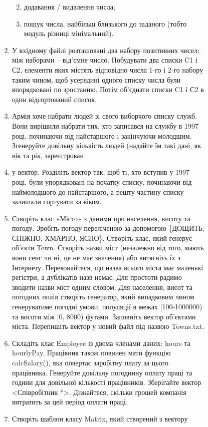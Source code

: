 \documentclass[]{article}
\makeatletter
\newcommand{\xslalph}[1]{\expandafter\@xslalph\csname c@#1\endcsname}
\newcommand{\@xslalph}[1]{%
    \ifcase#1\or а\or б\or в\or г\or д\or e\or є\or ж\or з\or i%
    \or й\or к\or л\or м\or н\or о\or п\or р\or с\or т%
    \or у\or ф\or х\or ц\or ч\or ш\or ю\or я\or аа\or бб\or вв%
    \else\@ctrerr\fi%
}
\makeatother
\begin{document}
\begin{enumerate}
\begin{enumerate}[label=\xslalph*)]
\begin{enumerate}
\begin{enumerate}[label=\xslalph*)]
\begin{enumerate}
  \begin{enumerate}
  \def\labelenumii{\alph{enumii}.}
  \item
    додавання / видалення числа;
  \item
    пошук числа, найбільш близького до заданого (тобто модуль різниці
    мінімальний).
  \end{enumerate}
\item
  У вхідному файлі розташовані два набору позитивних чисел; між наборами
  -- від'ємне число. Побудувати два списки C1 і С2, елементи яких
  містять відповідно числа 1-го і 2-го набору таким чином, щоб усередині
  одного списку числа були впорядковані по зростанню. Потім об'єднати
  списки C1 і С2 в один відсортований список.
\item
  Армія хоче набрати людей зі свого виборчого списку служб. Вони
  вирішили набрати тих, хто записався на службу в 1997 році, починаючи
  від найстаршого і закінчуючи молодшим. Згенеруйте довільну кількість
  людей (надайте їм такі дані, як вік та рік, зареєстрован\item у вектор.
  Розділіть вектор так, щоб ті, хто вступив у 1997 році, були
  упорядковані на початку списку, починаючи від наймолодшого до
  найстаршого, а решту частину списку залишали сортувати за віком.
\item
  Створіть клас «Місто» з даними про населення, висоту та погоду.
  Зробіть погоду переліченою за допомогою \{ДОЩИТЬ, СНІЖНО, ХМАРНО,
  ЯСНО\}. Створіть клас, який генерує об'єкти Town. Створіть назви міст
  (незалежно від того, мають вони сенс чи ні, це не має значення) або
  витягніть їх з Інтернету. Переконайтеся, що назва всього міста має
  маленькі регістри, а дублікатів назв немає. Для простоти радимо
  зводити назви міст одним словом. Для населення, висот та погодних
  полів створіть генератор, який випадковим чином генеруватиме погодні
  умови, популяції в межах {[}100-1000000) та висоти між {[}0, 8000)
  футами. Заповніть вектор об'єктами міста. Перепишіть вектор у новий
  файл під назвою Towns.txt.
\item
  Складіть клас Employee із двома членами даних: hours та hourlyPay.
  Працівник також повинен мати функцію calcSalary(), яка повертає
  заробітну плату за цього працівника. Генеруйте довільну погодинну
  оплату праці та години для довільної кількості працівників. Зберігайте
  вектор \textless{}Співробітник *\textgreater{}. Дізнайтеся, скільки
  грошей компанія витратить за цей період оплати праці.
\item
  Створіть шаблон класу Matrix, який створений з вектору

\end{enumerate}
\end{enumerate}
\end{enumerate}
\end{enumerate}
\end{enumerate}
\end{document}
